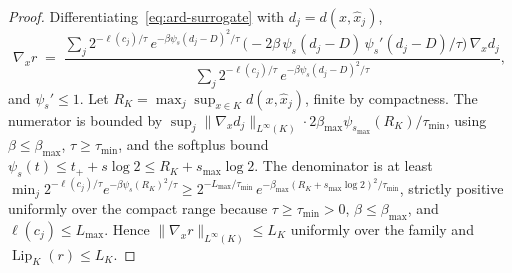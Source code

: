 \documentclass[11pt,a4paper]{article}
\theoremstyle{plain}
\theoremstyle{definition}
\theoremstyle{remark}
\DeclareMathOperator{\Lip}{Lip}
\begin{document}
\begin{proof}
Differentiating~\eqref{eq:ard-surrogate} with $d_j = d(x, \hat x_j)$,
\[
  \nabla_x r \;=\;
  \frac{\sum_j 2^{-\ell(c_j)/\tau}\,
  e^{-\beta \psi_s(d_j - D)^2/\tau}
  \,\bigl(-2\beta\,\psi_s(d_j-D)\,\psi_s'(d_j-D)/\tau\bigr)\,
  \nabla_x d_j}
  {\sum_j 2^{-\ell(c_j)/\tau}\, e^{-\beta \psi_s(d_j - D)^2/\tau}},
\]
and $\psi_s' \le 1$. Let $R_K = \max_j \sup_{x \in K} d(x, \hat x_j)$,
finite by compactness. The numerator is bounded by
$\sup_j\|\nabla_x d_j\|_{L^\infty(K)} \cdot 2\beta_{\max}
\psi_{s_{\max}}(R_K)/\tau_{\min}$, using $\beta \le \beta_{\max}$,
$\tau \ge \tau_{\min}$, and the softplus bound $\psi_s(t) \le t_+ +
s\log 2 \le R_K + s_{\max}\log 2$. The denominator is at least
$\min_j 2^{-\ell(c_j)/\tau} e^{-\beta\psi_{s}(R_K)^2/\tau} \ge
2^{-L_{\max}/\tau_{\min}}\, e^{-\beta_{\max}(R_K + s_{\max}\log
2)^2/\tau_{\min}}$, strictly positive uniformly over the compact
range because $\tau \ge \tau_{\min} > 0$, $\beta \le \beta_{\max}$,
and $\ell(c_j) \le L_{\max}$. Hence
$\|\nabla_x r\|_{L^\infty(K)} \le L_K$ uniformly over the family and
$\Lip_K(r) \le L_K$.
\end{proof}
\end{document}
